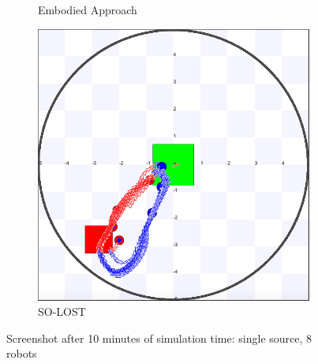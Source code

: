\documentclass[letterpaper, 10 pt, conference]{ieeeconf}  %
\begin{document}
\begin{figure}[h]
\begin{subfigure}{.25\textwidth}
          \centering
          \caption{Embodied Approach}
     \end{subfigure}
    \centering
     \begin{subfigure}{.25\textwidth}
       \includegraphics[width=0.9\linewidth]{images/so-lost/1/raw/8.png}
          \centering
          \caption{SO-LOST}
     \end{subfigure}
   
   \centering
   \caption{Screenshot after 10 minutes of simulation time: single source, 8 robots}
   \label{fig:screenshot_1_source}
\end{figure}
\end{document}
